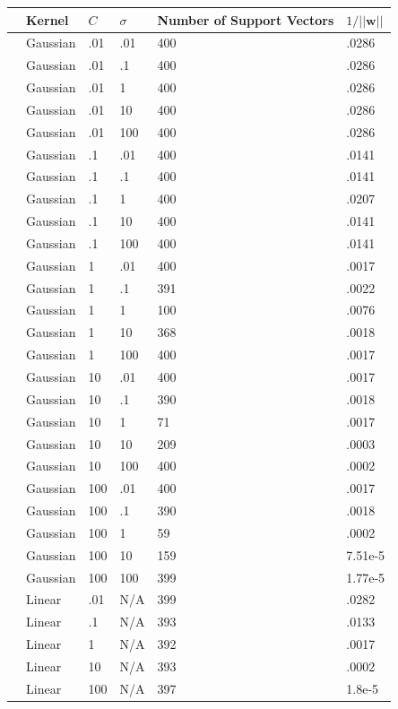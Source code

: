 \documentclass[10pt]{article}
\begin{document}
\begin{table}
\centering
\begin{tabular}{llllll}
\toprule
{} &                        Kernel &      $C$ &   $\sigma$ &    Number of Support Vectors & $1/||\mathbf{w}||$ \\
\midrule
&    Gaussian &    .01 &    .01 &   400 &    .0286 \\
&    Gaussian &    .01 &    .1 &   400 &    .0286 \\
&    Gaussian &    .01 &    1 &   400 &    .0286 \\
&    Gaussian &    .01 &    10 &   400 &    .0286 \\
&    Gaussian &    .01 &    100 &   400 &    .0286 \\
&    Gaussian &    .1 &    .01 &   400 &    .0141 \\
&    Gaussian &    .1 &    .1 &   400 &    .0141 \\
&    Gaussian &    .1 &    1 &   400 &    .0207 \\
&    Gaussian &    .1 &    10 &   400 &    .0141 \\
&    Gaussian &    .1 &    100 &   400 &    .0141 \\
&    Gaussian &    1 &    .01 &   400 &    .0017 \\
&    Gaussian &    1 &    .1 &   391 &    .0022 \\
&    Gaussian &    1 &    1 &   100 &    .0076 \\
&    Gaussian &    1 &    10 &   368 &    .0018 \\
&    Gaussian &    1 &    100 &   400 &    .0017 \\
&    Gaussian &    10 &    .01 &   400 &    .0017 \\
&    Gaussian &    10 &    .1 &   390 &    .0018 \\
&    Gaussian &    10 &    1 &   71 &    .0017 \\
&    Gaussian &    10 &    10 &   209 &    .0003 \\
&    Gaussian &    10 &    100 &   400 &    .0002 \\
&    Gaussian &    100 &    .01 &   400 &    .0017 \\
&    Gaussian &    100 &    .1 &   390 &    .0018 \\
&    Gaussian &    100 &    1 &   59 &    .0002 \\
&    Gaussian &    100 &    10 &   159 &    7.51e-5 \\
&    Gaussian &    100 &    100 &   399 &    1.77e-5 \\
&    Linear &    .01 &    N/A &   399 &    .0282 \\
&    Linear &    .1 &    N/A &   393 &    .0133 \\
&    Linear &    1 &    N/A &   392 &    .0017 \\
&    Linear &    10 &    N/A &   393 &    .0002 \\
&    Linear &    100 &    N/A &   397 &    1.8e-5 \\
\midrule
\bottomrule
\end{tabular}
\end{table}
\end{document}
